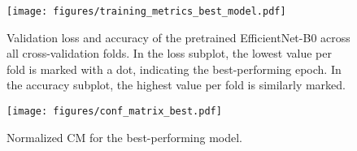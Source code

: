 \begin{figure}[ht]
\centering
\texttt{[image: figures/training\_metrics\_best\_model.pdf]}
\caption{
    Validation loss and accuracy of the pretrained EfficientNet-B0 across all cross-validation folds.
    In the loss subplot, the lowest value per fold is marked with a dot, indicating the best-performing epoch.
    In the accuracy subplot, the highest value per fold is similarly marked.
    }
\label{fig:training_metrics_best_model}
\end{figure}



\begin{figure}[ht]
\centering
\texttt{[image: figures/conf\_matrix\_best.pdf]}
\caption{Normalized \acs{CM} for the best-performing model.}
\label{fig:conf_matrix_best}
\end{figure}